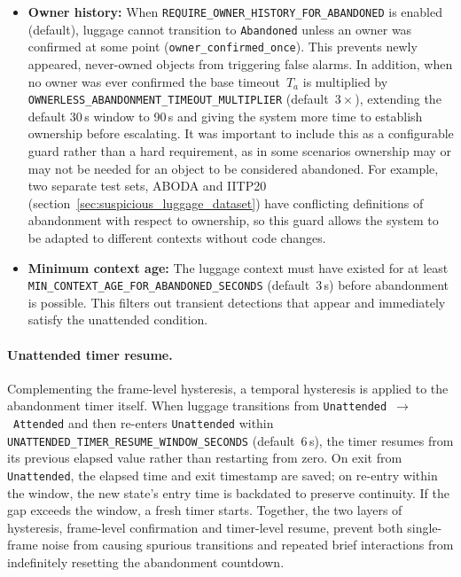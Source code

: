 \begin{itemize}
	\item \textbf{Owner history:} When
	      \texttt{REQUIRE\_OWNER\_HISTORY\_FOR\_ABANDONED} is enabled (default),
	      luggage cannot transition to \texttt{Abandoned} unless an owner was
	      confirmed at some point (\texttt{owner\_confirmed\_once}). This
	      prevents newly appeared, never-owned objects from triggering false
	      alarms. In addition, when no owner was ever confirmed the base
	      timeout~$T_a$ is multiplied by
	      \texttt{OWNERLESS\_ABANDONMENT\_TIMEOUT\_MULTIPLIER} (default~$3\times$),
	      extending the default 30\,s window to 90\,s and giving the system more
	      time to establish ownership before escalating. It was important to include
	      this as a configurable guard rather than a hard requirement,
	      as in some scenarios ownership may or may not be needed for an object to be
	      considered abandoned. For example, two separate test sets, ABODA and IITP20
	      (section~\ref{sec:suspicious_luggage_dataset}) have conflicting
	      definitions of abandonment with respect to ownership, so this guard allows the
	      system to be adapted to different contexts without code changes.
	\item \textbf{Minimum context age:} The luggage context must have existed for
	      at least \texttt{MIN\_CONTEXT\_AGE\_FOR\_ABANDONED\_SECONDS}
	      (default~3\,s) before abandonment is possible. This filters out
	      transient detections that appear and immediately satisfy the unattended
	      condition.
\end{itemize}

\paragraph{Unattended timer resume.}

Complementing the frame-level hysteresis, a temporal hysteresis is applied to
the abandonment timer itself. When luggage transitions from
\texttt{Unattended}~$\to$~\texttt{Attended} and then re-enters
\texttt{Unattended} within \texttt{UNATTENDED\_TIMER\_RESUME\_WINDOW\_SECONDS}
(default~6\,s), the timer resumes from its previous elapsed value rather than
restarting from zero. On exit from \texttt{Unattended}, the elapsed time and
exit timestamp are saved; on re-entry within the window, the new state's entry
time is backdated to preserve continuity. If the gap exceeds the window, a
fresh timer starts. Together, the two layers of hysteresis, frame-level
confirmation and timer-level resume, prevent both single-frame noise from
causing spurious transitions and repeated brief interactions from indefinitely
resetting the abandonment countdown.

